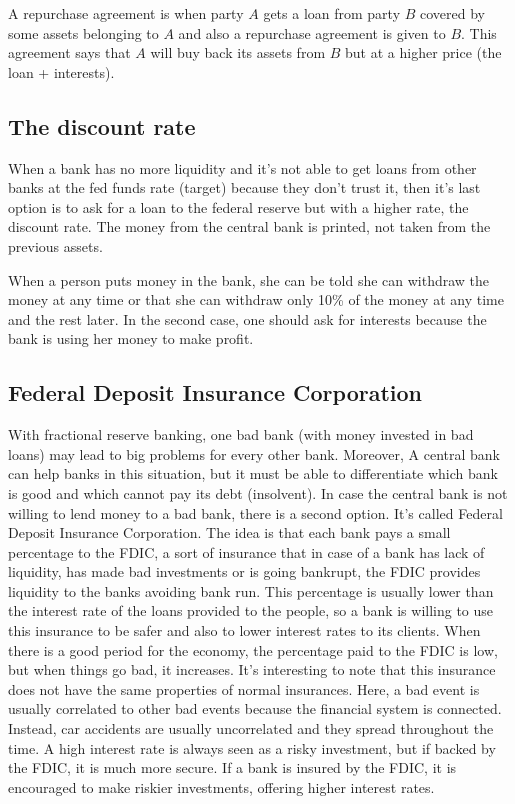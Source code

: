 A repurchase agreement is when party $A$ gets a loan from party $B$ covered by some assets belonging to $A$ and also a repurchase agreement is given to $B$. This agreement says that $A$ will buy back its assets from $B$ but at a higher price (the loan + interests).

\subsection{The discount rate}
When a bank has no more liquidity and it's not able to get loans from other banks at the fed funds rate (target) because they don't trust it, then it's last option is to ask for a loan to the federal reserve but with a higher rate, the discount rate. The money from the central bank is printed, not taken from the previous assets.

When a person puts money in the bank, she can be told she can withdraw the money at any time or that she can withdraw only 10\% of the money at any time and the rest later. In the second case, one should ask for interests because the bank is using her money to make profit.

\subsection{Federal Deposit Insurance Corporation}
With fractional reserve banking, one bad bank (with money invested in bad loans) may lead to big problems for every other bank. Moreover, A central bank can help banks in this situation, but it must be able to differentiate which bank is good and which cannot pay its debt (insolvent). In case the central bank is not willing to lend money to a bad bank, there is a second option. It's called Federal Deposit Insurance Corporation. The idea is that each bank pays a small percentage to the FDIC, a sort of insurance that in case of a bank has lack of liquidity, has made bad investments or is going bankrupt, the FDIC provides liquidity to the banks avoiding bank run. This percentage is usually lower than the interest rate of the loans provided to the people, so a bank is willing to use this insurance to be safer and also to lower interest rates to its clients. When there is a good period for the economy, the percentage paid to the FDIC is low, but when things go bad, it increases. It's interesting to note that this insurance does not have the same properties of normal insurances. Here, a bad event is usually correlated to other bad events because the financial system is connected. Instead, car accidents are usually uncorrelated and they spread throughout the time. A high interest rate is always seen as a risky investment, but if backed by the FDIC, it is much more secure. If a bank is insured by the FDIC, it is encouraged to make riskier investments, offering higher interest rates. 

